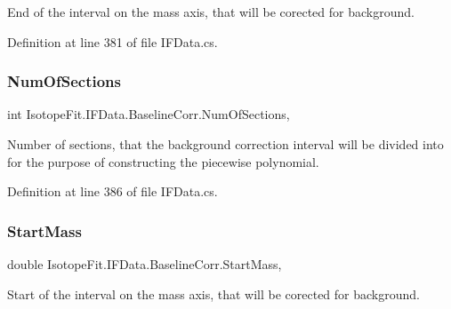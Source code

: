End of the interval on the mass axis, that will be corected for background. 



Definition at line 381 of file I\+F\+Data.\+cs.

\mbox{\label{class_isotope_fit_1_1_i_f_data_1_1_baseline_corr_a61f4eeb14295a1d2ba1b80dd36163505}} 
\subsubsection{\texorpdfstring{Num\+Of\+Sections}{NumOfSections}}
{\footnotesize\ttfamily int Isotope\+Fit.\+I\+F\+Data.\+Baseline\+Corr.\+Num\+Of\+Sections\hspace{0.3cm}{\ttfamily [get]}, {\ttfamily [set]}}



Number of sections, that the background correction interval will be divided into for the purpose of constructing the piecewise polynomial. 



Definition at line 386 of file I\+F\+Data.\+cs.

\mbox{\label{class_isotope_fit_1_1_i_f_data_1_1_baseline_corr_a9c464d39ab74e62c887b450002256902}} 
\subsubsection{\texorpdfstring{Start\+Mass}{StartMass}}
{\footnotesize\ttfamily double Isotope\+Fit.\+I\+F\+Data.\+Baseline\+Corr.\+Start\+Mass\hspace{0.3cm}{\ttfamily [get]}, {\ttfamily [set]}}



Start of the interval on the mass axis, that will be corected for background. 



